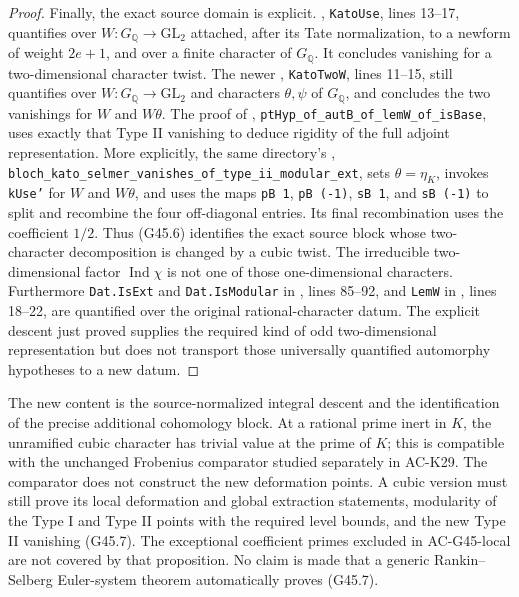 \begin{proof}
Finally, the exact source domain is explicit.
, \texttt{KatoUse},
lines 13--17, quantifies over $W:G_{\mathbb Q}\to\mathrm{GL}_2$
attached, after its Tate normalization, to a newform of weight
$2e+1$, and over a finite character of $G_{\mathbb Q}$.
It concludes vanishing for a two-dimensional character twist.
The newer
,
\texttt{KatoTwoW}, lines 11--15, still quantifies over
$W:G_{\mathbb Q}\to\mathrm{GL}_2$ and characters
$\theta,\psi$ of $G_{\mathbb Q}$, and concludes the two
vanishings for $W$ and $W\theta$.
The proof of
,
\texttt{ptHyp\_of\_autB\_of\_lemW\_of\_isBase},
uses exactly that Type II vanishing to deduce rigidity of the
full adjoint representation.
More explicitly, the same directory's
,
\texttt{bloch\_kato\_selmer\_vanishes\_of\_type\_ii\_modular\_ext},
sets $\theta=\eta_K$, invokes \texttt{kUse'} for $W$ and
$W\theta$, and uses the maps \texttt{pB 1},
\texttt{pB (-1)}, \texttt{sB 1}, and \texttt{sB (-1)}
to split and recombine the four off-diagonal entries.
Its final recombination uses the coefficient $1/2$.
Thus (G45.6) identifies the exact source block whose two-character
decomposition is changed by a cubic twist.
The irreducible two-dimensional factor $\operatorname{Ind}\chi$
is not one of those one-dimensional characters.
Furthermore \texttt{Dat.IsExt} and \texttt{Dat.IsModular}
in , lines 85--92,
and \texttt{LemW} in
,
lines 18--22, are quantified over the original rational-character
datum.  The explicit descent just proved supplies the required
kind of odd two-dimensional representation but does not transport
those universally quantified automorphy hypotheses to a new datum.
\end{proof}

\begin{remark}
The new content is the source-normalized integral descent and
the identification of the precise additional cohomology block.
At a rational prime inert in $K$, the unramified cubic character
has trivial value at the prime of $K$; this is compatible with
the unchanged Frobenius comparator studied separately in AC-K29.
The comparator does not construct the new deformation points.
A cubic version must still prove its local deformation and
global extraction statements, modularity of the Type I and
Type II points with the required level bounds, and the new
Type II vanishing (G45.7).  The exceptional coefficient primes
excluded in AC-G45-local are not covered by that proposition.
No claim is made that a generic Rankin--Selberg Euler-system
theorem automatically proves (G45.7).
\end{remark}

